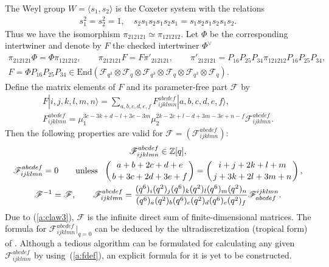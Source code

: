 The Weyl group $W =\langle s_1, s_2 \rangle$ is the Coxeter system
with the relations
\begin{gather*}
s_1^2=s_2^2=1,\quad
s_2s_1s_2s_1s_2s_1 = s_1s_2s_1s_2s_1s_2.
\end{gather*}
Thus we have the isomorphism
$\pi_{212121} \simeq \pi_{121212}$.
Let $\Phi$ be the corresponding intertwiner and denote by $F$
the checked intertwiner $\Phi^\vee$
\begin{gather}
 \pi_{212121} \Phi = \Phi\pi_{121212},\qquad
\pi_{212121} F = F \pi'_{212121},\qquad
\pi'_{212121}
= P_{16}P_{25}P_{34}\pi_{121212}P_{16}P_{25}P_{34},\nonumber
\\
F = \Phi  P_{16}P_{25}P_{34}\in
\mathrm{End}(\mathcal{F}_{q^3}\otimes
\mathcal{F}_{q}\otimes
\mathcal{F}_{q^3}\otimes
\mathcal{F}_{q}\otimes
\mathcal{F}_{q^3}\otimes
\mathcal{F}_{q}).\label{a:fdef}
\end{gather}
Def\/ine the matrix elements of $F$ and its parameter-free part
$\mathscr{F}$ by
\begin{gather*}
F |i,j,k,l,m,n \rangle=
\sum_{a,b,c,d,e,f}F^{abcdef}_{ijklmn}|a,b,c,d,e,f \rangle,\\
F^{a b c d e f}_{i j k l m n} =
\mu_1^{3c-3k+d-l+3e-3m}
\mu_2^{2k-2c+l-d+3m-3e+n-f}
\mathscr{F}^{a b c d e f}_{i j k l m n}.
\end{gather*}
Then the following properties are valid for
$\mathscr{F} = (\mathscr{F}^{abcdef}_{ijklmn})$:
\begin{gather}
\mathscr{F}^{abcdef}_{ijklmn} \in \mathbb{Z}[q],\nonumber\\
\mathscr{F}^{abcdef}_{ijklmn}=0 \qquad \mathrm{unless}\ \
\left({a + b + 2c + d + e \atop b + 3c + 2d + 3e + f}\right)=
\left({i + j + 2k + l + m\atop j + 3k + 2l + 3m + n}\right),
\label{a:claw3}\\
\mathscr{F}^{-1} = \mathscr{F},\qquad
\mathscr{F}^{abcdef}_{ijklmn}
=\frac{(q^6)_i(q^2)_j(q^6)_k(q^2)_l(q^6)_m(q^2)_n}
{(q^6)_a(q^2)_b(q^6)_c(q^2)_d(q^6)_e(q^2)_f}
\mathscr{F}^{ijklmn}_{abcdef}.
\label{a:fprop}
\end{gather}
Due to (\ref{a:claw3}), $\mathscr{F}$ is the inf\/inite direct sum
of f\/inite-dimensional matrices.
The formula for $\mathscr{F}^{abcdef}_{ijklmn}|_{q=0}$
can be deduced by the ultradiscretization (tropical form) of \cite[Theorem~3.1(c)]{BZ97}.
Although a tedious algorithm can be formulated
for calculating any given $\mathscr{F}^{abcdef}_{ijklmn}$ by using~(\ref{a:fdef}),
an explicit formula for it is yet to be constructed.

